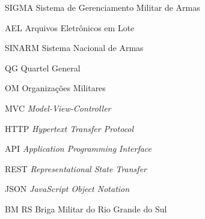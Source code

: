 \begin{siglas}
  \item[SIGMA] Sistema de Gerenciamento Militar de Armas
  \item[AEL] Arquivos Eletrônicos em Lote 
  \item[SINARM] Sistema Nacional de Armas 
  \item[QG] Quartel General
  \item[OM] Organizações Militares
  \item[MVC] \textit{Model-View-Controller}
  \item[HTTP] \textit{Hypertext Transfer Protocol}
  \item[API] \textit{Application Programming Interface}
  \item[REST] \textit{Representational State Transfer}
  \item[JSON] \textit{JavaScript Object Notation}
  \item[BM RS] Briga Militar do Rio Grande do Sul 
  
\end{siglas}